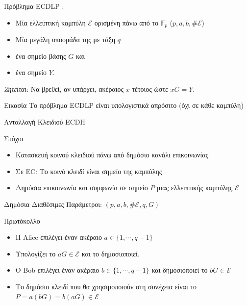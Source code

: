 \documentclass[handout]{beamer}
\begin{document}
\begin{frame}{Πρόβλημα ECDLP}
: 

\begin{itemize}
\item Μία ελλειπτική καμπύλη $\mathcal E$ ορισμένη πάνω από το $\mathbb{F}_p$ ($p,a,b,\# \mathcal E$)
\item Μία μεγάλη υποομάδα της με τάξη $q$ 
\item ένα σημείο βάσης $G$  και  
\item ένα σημείο  $Y$. 
\end{itemize}
\alert{\emph{Ζητείται}}:
Να βρεθεί, αν υπάρχει, ακέραιος $x$ τέτοιος ώστε $xG=Y$.

\pause
\begin{block}{Εικασία}
Το πρόβλημα ECDLP είναι υπολογιστικά απρόσιτο (όχι σε κάθε καμπύλη)
\end{block}

\end{frame}

\begin{frame}[allowframebreaks]{Ανταλλαγή Κλειδιού ECDH}
\begin{block}{Στόχοι}
\begin{itemize}
\item Κατασκευή κοινού κλειδιού πάνω από δημόσιο κανάλι επικοινωνίας
\item Σε EC: Το κοινό κλειδί είναι σημείο της καμπύλης
\item Δημόσια επικοινωνία και συμφωνία σε σημείο $P$  μιας ελλειπτικής καμπύλης $\mathcal E$
\end{itemize}
\end{block}

Δημόσια Διαθέσιμες Παράμετροι: $(p,a,b,\# \mathcal E,q,G)$
\framebreak
\begin{block}{Πρωτόκολλο}
\begin{itemize}
\item H {Alice} επιλέγει έναν ακέραιο $a \in \{1, \cdots, q-1 \}$
\item Υπολογίζει το $aG \in \mathcal E$ και το δημοσιοποιεί.
\item Ο {Bob} επιλέγει έναν ακέραιο $b \in \{1, \cdots, q-1 \}$ και δημοσιοποιεί το $bG \in \mathcal E$
\item Το δημόσιο κλειδί που θα χρησιμοποιούν στη συνέχεια είναι το $P=a(bG)=b(aG) \in \mathcal E$
\end{itemize}
\end{block}

\end{frame}
\end{document}
